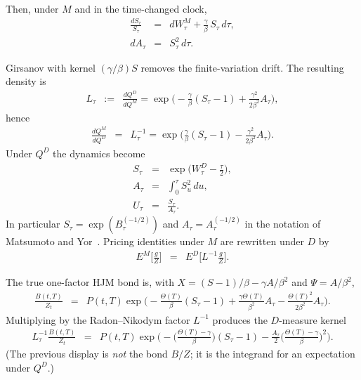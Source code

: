 \documentclass[12pt,a4paper,final]{article}
\theoremstyle{plain}
\begin{document}
Then, under $M$ and in the time-changed clock,
\begin{eqnarray}
\frac{dS_{\tau}}{S_{\tau}}&=&dW^{M}_{\tau}+\frac{\gamma}{\beta}\,S_{\tau}\,d\tau,\\
dA_{\tau}&=&S^{2}_{\tau}\,d\tau.
\end{eqnarray}

Girsanov with kernel $(\gamma/\beta)S$ removes the finite-variation drift.
The resulting density is
\begin{eqnarray*}
L_{\tau}
&:=&
\frac{dQ^{D}}{dQ^{M}}
=\exp\Biggl(-\frac{\gamma}{\beta}(S_{\tau}-1)+\frac{\gamma^{2}}{2\beta^{2}}A_{\tau}\Biggr),
\end{eqnarray*}
hence
\begin{eqnarray*}
\frac{dQ^{M}}{dQ^{D}}
&=&L_{\tau}^{-1}
=\exp\Biggl(\frac{\gamma}{\beta}(S_{\tau}-1)-\frac{\gamma^{2}}{2\beta^{2}}A_{\tau}\Biggr).
\end{eqnarray*}
Under $Q^{D}$ the dynamics become
\begin{eqnarray*}
S_{\tau}&=&\exp\Biggl(W^{D}_{\tau}-\frac{\tau}{2}\Biggr),\\
A_{\tau}&=&\int_0^{\tau} S^{2}_{u}\,du,\\
U_{\tau}&=&\frac{S_{\tau}}{A_{\tau}}.
\end{eqnarray*}
In particular $S_{\tau}=\exp(B_{\tau}^{(-1/2)})$ and
$A_{\tau}=A_{\tau}^{(-1/2)}$ in the notation of Matsumoto and Yor~\cite{YOR}.
Pricing identities under $M$ are rewritten under $D$ by
\begin{eqnarray*}
E^{M}\Biggl[\frac{g}{Z}\Biggr]
&=&
E^{D}\Biggl[L^{-1}\frac{g}{Z}\Biggr].
\end{eqnarray*}

The true one-factor HJM bond is, with $X=(S-1)/\beta-\gamma A/\beta^{2}$ and
$\Psi=A/\beta^{2}$,
\begin{eqnarray*}
\frac{B(t,T)}{Z_t}
&=&P(t,T)\exp\Biggl(
-\frac{\Theta(T)}{\beta}(S_{\tau}-1)
+\frac{\gamma\Theta(T)}{\beta^{2}}A_{\tau}
-\frac{\Theta(T)^{2}}{2\beta^{2}}A_{\tau}
\Biggr).
\end{eqnarray*}
Multiplying by the Radon--Nikodym factor $L^{-1}$ produces the $D$-measure
kernel
\begin{eqnarray*}
L_{\tau}^{-1}\frac{B(t,T)}{Z_t}
&=&P(t,T)\exp\Biggl(
-\Biggl(\frac{\Theta(T)-\gamma}{\beta}\Biggr)(S_{\tau}-1)
-\frac{A_{\tau}}{2}
\Biggl(\frac{\Theta(T)-\gamma}{\beta}\Biggr)^{2}
\Biggr).
\end{eqnarray*}
(The previous display is \emph{not} the bond $B/Z$; it is the integrand for
an expectation under $Q^{D}$.)
\end{document}
